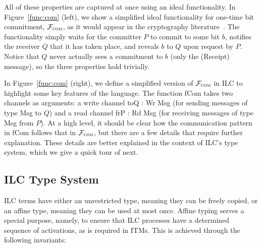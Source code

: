 %
All of these properties are captured at once using an ideal functionality. In
Figure~\ref{func:com} (left), we show a simplified ideal functionality for
one-time bit commitment, $\mathcal{{F}}_{\textsc{com}}$, as it would appear in the
cryptography literature~\cite{canetti2001commitments}. The functionality simply
waits for the committer $P$ to commit to some bit $b$, notifies the receiver $Q$
that it has taken place, and reveals $b$ to $Q$ upon request by $P$. Notice that
$Q$ never actually sees a commitment to $b$ (only the (\textsf{Receipt})
message), so the three properties hold trivially.
%

In Figure~\ref{func:com} (right), we define a simplified version of
$\mathcal{{F}}_{\textsc{com}}$ in ILC to highlight some key features of the
language. The function \textsf{fCom} takes two channels as arguments: a write
channel \textsf{toQ : Wr Msg} (for sending messages of type \textsf{Msg} to $Q$)
and a read channel \textsf{frP : Rd Msg} (for receiving messages of type
\textsf{Msg} from $P$). At a high level, it should be clear how the
communication pattern in \textsf{fCom} follows that in $\mathcal{{F}}_{\textsc{com}}$,
but there are a few details that require further explanation. These details are
better explained in the context of ILC's type system, which we give a quick tour
of next.

\subsection{ILC Type System}
\label{subsec:type-tour}

ILC terms have either an unrestricted type, meaning they can be freely copied,
or an affine type, meaning they can be used at most once. Affine typing serves a
special purpose, namely, to ensure that ILC processes have a determined sequence
of activations, as is required in ITMs. This is achieved through the following
invariants:

